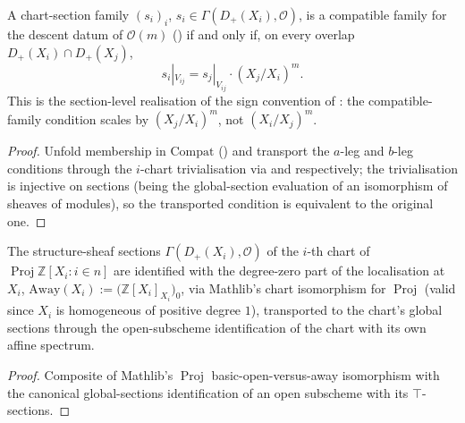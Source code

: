 \begin{lemma}
  \label{lem:serre_twist_compatible_condition}
  A chart-section family \((s_i)_i\), \(s_i \in \Gamma(D_+(X_i), \mathcal O)\),
  is a compatible family for the descent datum of \(\mathcal O(m)\)
  () if and only if, on every overlap
  \(D_+(X_i) \cap D_+(X_j)\),
  \[
    s_i|_{V_{ij}} = s_j|_{V_{ij}} \cdot (X_j/X_i)^m .
  \]
  This is the section-level realisation of the sign convention of
  : the compatible-family condition scales by
  \((X_j/X_i)^m\), not \((X_i/X_j)^m\).
\end{lemma}
\begin{proof}\leanok
  Unfold membership in \(\mathrm{Compat}\) ()
  and transport the \(a\)-leg and \(b\)-leg conditions through the
  \(i\)-chart trivialisation via  and
   respectively; the trivialisation is injective
  on sections (being the global-section evaluation of an isomorphism of
  sheaves of modules), so the transported condition is equivalent to the
  original one.
\end{proof}

\begin{definition}
  \label{def:chart_sections_away}
  The structure-sheaf sections \(\Gamma(D_+(X_i), \mathcal O)\) of the
  \(i\)-th chart of \(\operatorname{Proj} \mathbb Z[X_i : i \in n]\) are
  identified with the degree-zero part of the localisation at \(X_i\),
  \(\mathrm{Away}(X_i) := \bigl(\mathbb Z[X_i]_{X_i}\bigr)_0\), via Mathlib's
  chart isomorphism for \(\operatorname{Proj}\) (valid since \(X_i\) is
  homogeneous of positive degree \(1\)), transported to the chart's global
  sections through the open-subscheme identification of the chart with its
  own affine spectrum.
\end{definition}
\begin{proof}\leanok
  Composite of Mathlib's \(\operatorname{Proj}\) basic-open-versus-away
  isomorphism with the canonical global-sections identification of an open
  subscheme with its \(\top\)-sections.
\end{proof}

